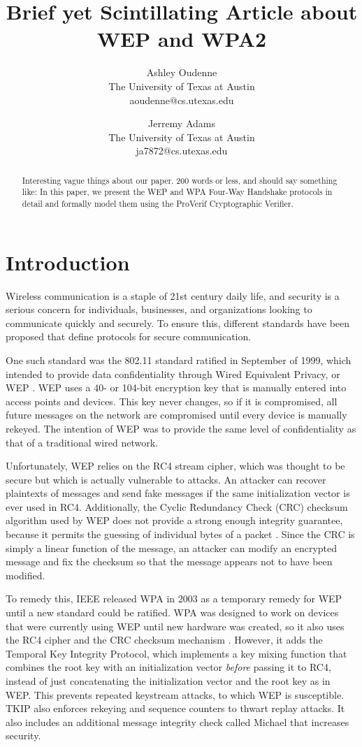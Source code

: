 \documentclass[11pt, twocolumn]{article} %
\title{\textbf{Brief yet Scintillating Article about WEP and WPA2}}
\author{
	Ashley Oudenne\\
	The University of Texas at Austin\\
	aoudenne@cs.utexas.edu\\
	\and
	Jerremy Adams\\
	The University of Texas at Austin\\
	ja7872@cs.utexas.edu
}
\begin{document}
\maketitle
\begin{abstract}
Interesting vague things about our paper.
200 words or less, and should say something like:
In this paper, we present the WEP and WPA Four-Way Handshake protocols in detail and formally model them using the ProVerif Cryptographic Verifier. 
\end{abstract}

\section{Introduction}
Wireless communication is a staple of 21st century daily life, and security is a serious concern for individuals, businesses, and organizations looking to communicate quickly and securely.  To ensure this, different standards have been proposed that define protocols for secure communication.  

One such standard was the 802.11 standard ratified in September of 1999, which intended to provide data confidentiality through Wired Equivalent Privacy, or WEP \cite{IEEE802.11}.  WEP uses a 40- or 104-bit encryption key that is manually entered into access points and devices.  This key never changes, so if it is compromised, all future messages on the network are compromised until every device is manually rekeyed.  The intention of WEP was to provide the same level of confidentiality as that of a traditional wired network.  

Unfortunately, WEP relies on the RC4 stream cipher, which was thought to be secure but which is actually vulnerable to attacks.  An attacker can recover plaintexts of messages and send fake messages if the same initialization vector is ever used in RC4.  Additionally, the Cyclic Redundancy Check (CRC) checksum algorithm used by WEP does not provide a strong enough integrity guarantee, because it permits the guessing of individual bytes of a packet \cite{bulbul08}.  Since the CRC is simply a linear function of the message, an attacker can modify an encrypted message and fix the checksum so that the message appears not to have been modified.

To remedy this, IEEE released WPA in 2003 as a temporary remedy for WEP until a new standard could be ratified.  WPA was designed to work on devices that were currently using WEP until new hardware was created, so it also uses the RC4 cipher and the CRC checksum mechanism \cite{wpa03}.  However, it adds the Temporal Key Integrity Protocol, which implements a key mixing function that combines the root key with an initialization vector \textit{before} passing it to RC4, instead of just concatenating the initialization vector and the root key as in WEP.  This prevents repeated keystream attacks, to which WEP is susceptible.  TKIP also enforces rekeying and sequence counters to thwart replay attacks.  It also includes an additional message integrity check called Michael that increases security.  
\end{document}
